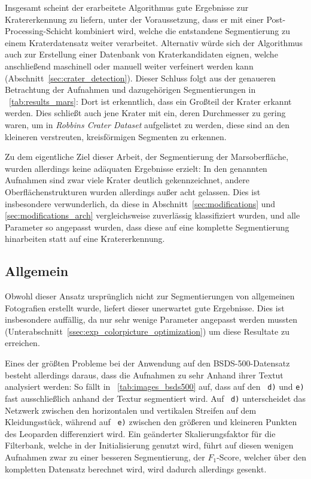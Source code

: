 Insgesamt scheint der erarbeitete Algorithmus gute Ergebnisse zur Kratererkennung zu liefern, unter der Voraussetzung, dass er mit einer Post-Processing-Schicht kombiniert wird, welche die entstandene Segmentierung zu einem Kraterdatensatz weiter verarbeitet. Alternativ würde sich der Algorithmus auch zur Erstellung einer Datenbank von Kraterkandidaten eignen, welche anschließend maschinell oder manuell weiter verfeinert werden kann (\vgl Abschnitt~\ref{sec:crater_detection}). Dieser Schluss folgt aus der genaueren Betrachtung der Aufnahmen und dazugehörigen Segmentierungen in \tablename~\ref{tab:results_mars}: Dort ist erkenntlich, dass ein Großteil der Krater erkannt werden. Dies schließt auch jene Krater mit ein, deren Durchmesser zu gering waren, um in \textit{Robbins Crater Dataset} aufgelistet zu werden, diese sind an den kleineren verstreuten, kreisförmigen Segmenten zu erkennen.

Zu dem eigentliche Ziel dieser Arbeit, der Segmentierung der Marsoberfläche, wurden allerdings keine adäquaten Ergebnisse erzielt: In den genannten Aufnahmen sind zwar viele Krater deutlich gekennzeichnet, andere Oberflächenstrukturen wurden allerdings außer acht gelassen. Dies ist insbesondere verwunderlich, da diese in Abschnitt~\ref{sec:modifications} und \ref{sec:modifications_arch} vergleichsweise zuverlässig klassifiziert wurden, und alle Parameter so angepasst wurden, dass diese auf eine komplette Segmentierung hinarbeiten statt auf eine Kratererkennung.

\subsection{Allgemein}
\label{ssec:discussion_allgemein}

Obwohl dieser Ansatz ursprünglich nicht zur Segmentierungen von allgemeinen Fotografien erstellt wurde, liefert dieser unerwartet gute Ergebnisse. Dies ist insbesondere auffällig, da nur sehr wenige Parameter angepasst werden mussten (\vgl Unterabschnitt~\ref{ssec:exp_colorpicture_optimization}) um diese Resultate zu erreichen.

Eines der größten Probleme bei der Anwendung auf den BSDS-500-Datensatz besteht allerdings daraus, dass die Aufnahmen zu sehr Anhand ihrer Textut analysiert werden: So fällt in \tablename~\ref{tab:images_bsds500} auf, dass \bspw auf den \figurename~\texttt{d)} und \texttt{e)} fast ausschließlich anhand der Textur segmentiert wird. Auf \figurename~\texttt{d)} unterscheidet das Netzwerk zwischen den horizontalen und vertikalen Streifen auf dem Kleidungsstück, während auf \figurename~\texttt{e)} zwischen den größeren und kleineren Punkten des Leoparden differenziert wird. Ein geänderter Skalierungsfaktor für die Filterbank, welche in der Initialisierung genutzt wird, führt auf diesen wenigen Aufnahmen zwar zu einer besseren Segmentierung, der $F_1$-Score, welcher über den kompletten Datensatz berechnet wird, wird dadurch allerdings gesenkt.

